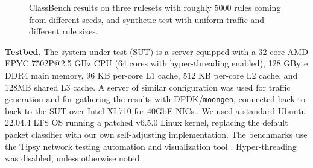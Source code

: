 \begin{figure*}
  \centering
  \subfloat[][acl1]{
    
    \label{fig:classbench-acl1}
  }
  \hspace{-1em}
  \subfloat[][ipc1]{
    
    \label{fig:classbench-ipc1}
  }
  \hspace{-1em}
  \subfloat[][fw1]{
    
    \label{fig:classbench-fw1}
  }
  \hspace{-1em}
  \caption{ClassBench results on three rulesets with roughly 5000 rules coming from different seeds, and synthetic test with uniform traffic and different rule sizes.}
  \label{fig:classbench}
\end{figure*}

\noindent
\textbf{Testbed.} %
The system-under-test (SUT) is a server equipped with a 32-core AMD EPYC 7502P@2.5 GHz CPU (64 cores with hyper-threading enabled), 128 GByte DDR4 main memory, 96 KB per-core L1 cache, 512 KB per-core L2 cache, and 128MB shared L3 cache. A server of similar configuration was used for traffic generation and for gathering the results with DPDK\slash \texttt{moongen}, connected back-to-back to the SUT over Intel XL710 for 40GbE NICs.. We used a standard Ubuntu 22.04.4 LTS OS running a patched v6.5.0 Linux kernel, replacing the default \nftables packet classifier with our own self-adjusting implementation. The benchmarks use the Tipsy network testing automation and visualization tool \cite{8468219}. Hyper-threading was disabled, unless otherwise noted.

